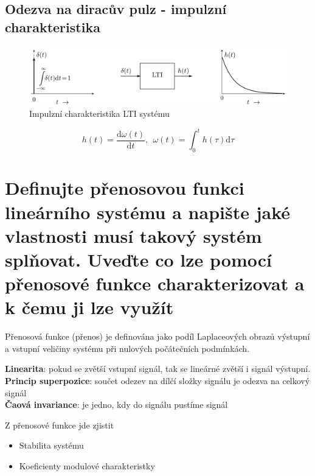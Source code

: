 \documentclass[a4paper,12pt]{article}   %
\begin{document}
\subsection*{Odezva na diracův pulz - impulzní charakteristika}
\begin{figure}[h!]
    \centering
    \includegraphics[width=\textwidth]{impusni_odezva.PNG}
    \caption{Impulzní charakteristika LTI systému}
\end{figure}
\begin{equation}
    h(t) = \frac{\text{d}\omega(t)}{\text{d}t},~~\omega(t) = \int_0^t h(\tau)\text{d}\tau
\end{equation}






\section{Definujte přenosovou funkci lineárního systému a napište jaké vlastnosti musí takový systém splňovat. Uveďte co lze pomocí přenosové funkce charakterizovat a k čemu ji lze využít}
Přenosová funkce (přenos) je definována jako podíl Laplaceových obrazů výstupní a vstupní veličiny systému při nulových počátečních podmínkách.

\textbf{Linearita}: pokud se zvětší vstupní signál, tak se lineárné zvětší i signál výstupní.\\
\textbf{Princip superpozice}: součet odezev na dílčí složky signálu je odezva na celkový signál\\
\textbf{Čaová invariance}: je jedno, kdy do signálu pustíme signál

Z přenosové funkce jde zjistit
\begin{itemize}
    \item Stabilita systému
    \item Koeficienty modulové charakteristky
\end{itemize}






\end{document}
